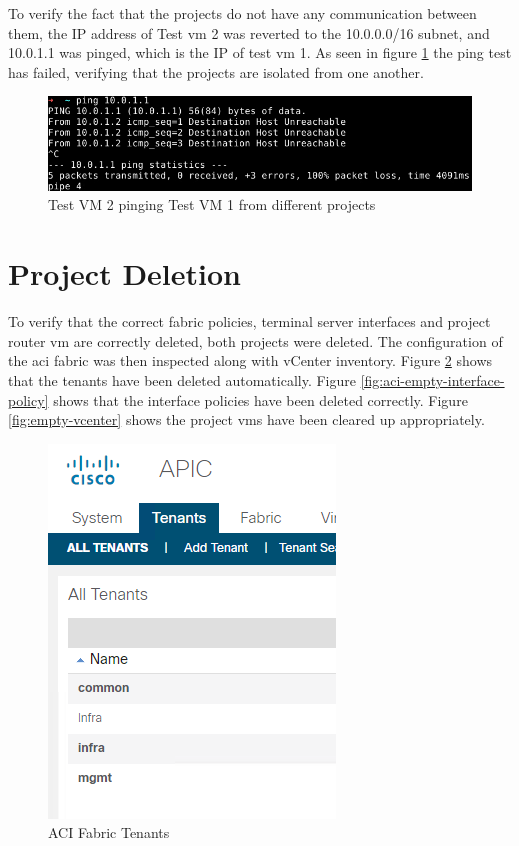 To verify the fact that the projects do not have any communication between them, the IP address of Test \gls{vm} 2 was reverted to the 10.0.0.0/16 subnet, and 10.0.1.1 was pinged, which is the IP of test \gls{vm} 1. As seen in figure \ref{fig:inter-project-communication} the ping test has failed, verifying that the projects are isolated from one another.

\begin{figure}[H]
    \centering
    \includegraphics[scale=1.2]{images/inter-project-communication.png}
    \caption{Test VM 2 pinging Test VM 1 from different projects}
    \label{fig:inter-project-communication}
\end{figure}

\section{Project Deletion}
To verify that the correct fabric policies, terminal server interfaces and project router \gls{vm} are correctly deleted, both projects were deleted. The configuration of the \gls{aci} fabric was then inspected along with vCenter inventory. Figure \ref{fig:aci-empty-tenants} shows that the tenants have been deleted automatically. Figure \ref{fig:aci-empty-interface-policy} shows that the interface policies have been deleted correctly. Figure \ref{fig:empty-vcenter} shows the project \gls{vm}s have been cleared up appropriately.


\begin{figure}[H]
    \centering
    \includegraphics[scale=1.2]{images/aci-empty-tenants.png}
    \caption{ACI Fabric Tenants}
    \label{fig:aci-empty-tenants}
\end{figure}

